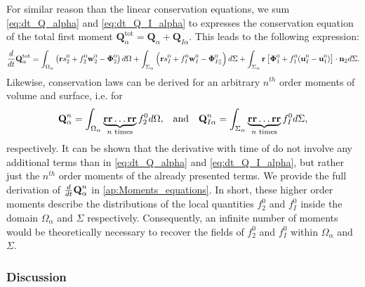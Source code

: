 For similar reason than the linear conservation equations, we sum \ref{eq:dt_Q_alpha} and \ref{eq:dt_Q_I_alpha} to expresses the conservation equation of the total first moment $\textbf{Q}_\alpha^\text{tot} = \textbf{Q}_\alpha + \textbf{Q}_{I\alpha}$.
This leads to the following expression:
\begin{multline}
    \frac{d}{d t} {\textbf{Q}_\alpha^\text{tot}}
    = \int_{\Omega_\alpha}  \left(
        \textbf{r} s_2^0         
        + f_2^0  \textbf{w}_2^0 
        - \mathbf{\Phi}_2^0
    \right)  d\Omega
    + \int_{\Sigma_\alpha}  \left(
        \textbf{r}s_I^0
        + f_I^0 \textbf{w}_I^0
        - \mathbf{\Phi}_{I||}^0
    \right)  d\Sigma
    + \int_{\Sigma_\alpha}  \textbf{r} \left[
        \mathbf{\Phi}_1^0
        + f_1^0 (\textbf{u}_I^0-\textbf{u}_1^0)
    \right]\cdot \textbf{n}_2   d\Sigma. 
    \label{eq:dt_Q_alpha_tot}
\end{multline}
Likewise, conservation laws can be derived for an arbitrary $n^{th}$ order moments of volume and surface, i.e. for
\begin{align}
    \textbf{Q}_\alpha^n
    = \int_{\Omega_\alpha} 
         \underbrace{\textbf{rr}\ldots \textbf{rr}}_{n\text{ times}}
        f_2^0  d\Omega,
        && \text{and} &&
    \textbf{Q}_{I\alpha}^n
    = \int_{\Sigma_\alpha} 
         \underbrace{\textbf{rr}\ldots \textbf{rr}}_{n\text{ times}}
    f_I^0  d\Sigma,
    \label{eq:Q_n_definition}
\end{align} 
respectively. 
It can be shown that the derivative with time of do not involve any additional terms than in \ref{eq:dt_Q_alpha} and \ref{eq:dt_Q_I_alpha}, but rather just the $n^{th}$ order moments of the already presented terms.
We provide the full derivation of $\frac{d}{d t}{ \textbf{Q}_\alpha^n}$ in \ref{ap:Moments_equations}.
In short, these higher order moments describe the distributions of the local quantities $f_2^0$ and $f_I^0$ inside the domain $\Omega_\alpha$ and $\Sigma$ respectively.
Consequently, an infinite number of moments would be theoretically necessary to recover the fields of $f_2^0$ and $f_I^0$  within $\Omega_\alpha$ and $\Sigma$. 

\subsubsection{Discussion}

